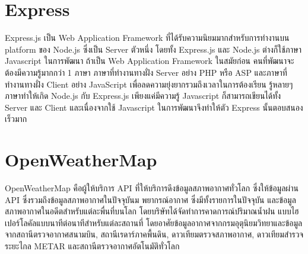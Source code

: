\section{Express}
Express.js เป็น Web Application Framework ที่ได้รับความนิยมมากสำหรับการทำงานบน platform ของ Node.js
ซึ่งเป็น Server ตัวหนึ่ง โดยทั้ง Express.js และ Node.js ต่างก็ใช้ภาษา Javascript ในการพัฒนา ถ้าเป็น Web
Application Framework ในสมัยก่อน คนที่พัฒนาจะต้องมีความรู้มากกว่า 1 ภาษา ภาษาที่ทำงานทางฝั่ง Server อย่าง PHP
หรือ ASP และภาษาที่ทำงานทางฝั่ง Client อย่าง JavaScript เพื่อลดความยุ่งยากรวมถึงเวลาในการต้องเรียน รู้หลายๆ ภาษาทำให้เกิด
Node.js กับ Express.js เพียงแค่มีความรู้ Javascript ก็สามารถเขียนได้ทั้ง Server และ Client และเนื่องจากใช้
Javascript ในการพัฒนาจึงทำให้ตัว Express นั้นตอบสนองเร็วมาก

\section{OpenWeatherMap}
OpenWeatherMap คือผู้ให้บริการ API ที่ให้บริการดึงข้อมูลสภาพอากาศทั่วโลก ซึ่งให้ข้อมูลผ่าน API ซึ่งรวมถึงข้อมูลสภาพอากาศในปัจจุบันม
พยากรณ์อากาศ ซึ่งมีทั้งรายการในปัจจุบัน และข้อมูลสภาพอากาศในอดีตสำหรับแต่ละพื่นที่บนโลก โดยบริษัทได้จัดทำการคาดการณ์ปริมาณน้ำฝน
แบบไฮเปอร์โลคัลแบบนาทีต่อนาทีสำหรับแต่ละสถานที่ โดยอาศัยข้อมูลอากาศจากกรมอุตุนิยมวิทยาและข้อมูลจากสถานีตรวจอากาศสนามบิน,
สถานีเรดาร์ภาคพื้นดิน, ดาวเทียมตรวจสภาพอากาศ, ดาวเทียมสำรวจระยะไกล METAR และสถานีตรวจอากาศอัตโนมัติทั่วโลก


